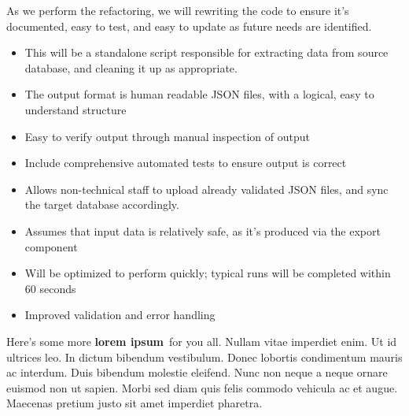 {As we perform the refactoring, we will rewriting the code to ensure it's documented, easy to test, and easy to update as future needs are identified.


\begin{itemize}
\itemsep1pt\parskip0pt
\item
  This will be a standalone script responsible for extracting data from source database, and cleaning it up as appropriate.
\item
  The output format is human readable JSON files, with a logical, easy to understand structure
\item
  Easy to verify output through manual inspection of output
\item
  Include comprehensive automated tests to ensure output is correct
\end{itemize}


\begin{itemize}
\itemsep1pt\parskip0pt
\item
  Allows non-technical staff to upload already validated JSON files, and sync the target database accordingly.
\item
  Assumes that input data is relatively safe, as it's produced via the export component
\item
  Will be optimized to perform quickly; typical runs will be completed within 60 seconds
\item
  Improved validation and error handling
\end{itemize}


Here's some more \textbf{lorem ipsum}~for you all. Nullam vitae imperdiet enim. Ut id ultrices leo. In dictum bibendum vestibulum. Donec lobortis condimentum mauris ac interdum. Duis bibendum molestie eleifend. Nunc non neque a neque ornare euismod non ut sapien. Morbi sed diam quis felis commodo vehicula ac et augue. Maecenas pretium justo sit amet imperdiet pharetra.

}
